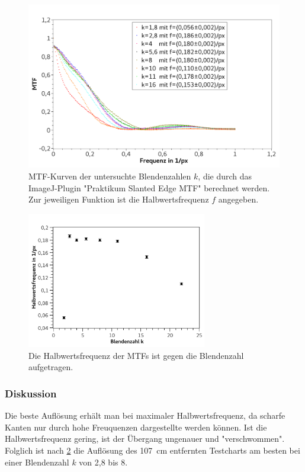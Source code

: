 \documentclass[
	a4paper,
	12pt,
	pagesize,
	ngerman
]{scrartcl}
\begin{document}
	\begin{figure}[H]  
		\includegraphics[width=1\textwidth]{fig_schraeg_kant}
		\centering
		\caption{
			MTF-Kurven der untersuchte Blendenzahlen $k$, die durch das ImageJ-Plugin "Praktikum Slanted Edge MTF" berechnet werden.
			Zur jeweiligen Funktion ist die Halbwertsfrequenz $f$ angegeben.
			}
		\label{fig_schraeg_kante_mtf}
		\centering
	\end{figure}

	\begin{figure}[H]  
		\includegraphics[width=0.7\textwidth]{fig_schraeg_kant_2}
		\centering
		\caption{
			Die Halbwertsfrequenz der MTFs ist gegen die Blendenzahl aufgetragen.
			}
		\label{fig_schraeg_kante}
		\centering
	\end{figure}

	\subsubsection{Diskussion}
	Die beste Auflösung erhält man bei maximaler Halbwertsfrequenz, da scharfe Kanten nur durch hohe Freuquenzen dargestellte werden können. 
	Ist die Halbwertsfrequenz gering, ist der Übergang ungenauer und "verschwommen".
	Folglich ist nach \cref{fig_schraeg_kante} die Auflösung des \SI{107}{cm} entfernten Testcharts am besten bei einer Blendenzahl $k$ von 2,8 bis 8.
	
\end{document}
